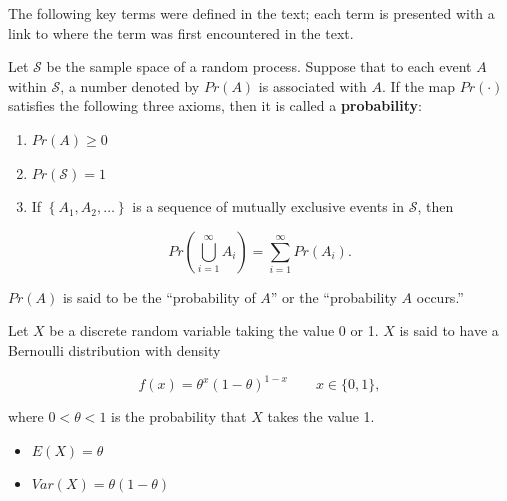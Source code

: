 \documentclass[
  letterpaper,
  DIV=11,
  numbers=noendperiod]{scrreprt}
\providecommand{\tightlist}{%
  \setlength{\itemsep}{0pt}\setlength{\parskip}{0pt}}\usepackage{longtable,booktabs,array}
\theoremstyle{definition}
\theoremstyle{plain}
\theoremstyle{definition}
\theoremstyle{remark}
\begin{document}
\providecommand{\norm}[1]{\left\lVert#1\right\rVert}
\providecommand{\abs}[1]{\left\lvert#1\right\rvert}
\providecommand{\dist}[1]{\stackrel{\text{#1}}{\sim}}
\providecommand{\ind}[1]{\mathbb{I}\left(#1\right)}
\providecommand{\bm}[1]{\mathbf{#1}}
\providecommand{\bs}[1]{\boldsymbol{#1}}
\providecommand{\Ell}{\mathcal{L}}
\providecommand{\indep}{\perp\negthickspace\negmedspace\perp}

The following key terms were defined in the text; each term is presented
with a link to where the term was first encountered in the text.

\begin{description}
\tightlist
\item[Axioms of Probability (Definition~\ref{def-axioms})]
Let \(\mathcal{S}\) be the sample space of a random process. Suppose
that to each event \(A\) within \(\mathcal{S}\), a number denoted by
\(Pr(A)\) is associated with \(A\). If the map \(Pr(\cdot)\) satisfies
the following three axioms, then it is called a \textbf{probability}:
\end{description}

\begin{enumerate}
\def\labelenumi{\arabic{enumi}.}
\tightlist
\item
  \(Pr(A) \geq 0\)
\item
  \(Pr(\mathcal{S}) = 1\)
\item
  If \(\left\{A_1, A_2, \dotsc\right\}\) is a sequence of mutually
  exclusive events in \(\mathcal{S}\), then
\end{enumerate}

\[Pr\left(\bigcup_{i = 1}^{\infty} A_i\right) = \sum_{i = 1}^{\infty} Pr\left(A_i\right).\]

\(Pr(A)\) is said to be the ``probability of \(A\)'' or the
``probability \(A\) occurs.''

\begin{description}
\tightlist
\item[Bernoulli Distribution
(Definition~\ref{def-bernoulli-distribution})]
Let \(X\) be a discrete random variable taking the value 0 or 1. \(X\)
is said to have a Bernoulli distribution with density
\end{description}

\[f(x) = \theta^x (1 - \theta)^{1 - x} \qquad x \in \{0, 1\},\]

where \(0 < \theta < 1\) is the probability that \(X\) takes the value
1.

\begin{itemize}
\tightlist
\item
  \(E(X) = \theta\)
\item
  \(Var(X) = \theta(1 - \theta)\)
\end{itemize}
\end{document}
